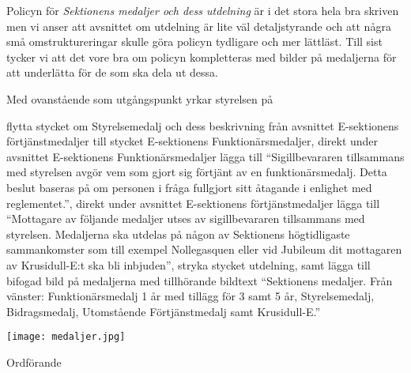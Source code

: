 \documentclass[../_main/handlingar.tex]{subfiles}
\begin{document}

Policyn för \emph{Sektionens medaljer och dess utdelning} är i det stora hela bra skriven men vi anser att avsnittet om utdelning är lite väl detaljstyrande och att några små omstruktureringar skulle göra policyn tydligare och mer lättläst. Till sist tycker vi att det vore bra om policyn kompletteras med bilder på medaljerna för att underlätta för de som ska dela ut dessa.

Med ovanstående som utgångspunkt yrkar styrelsen på

\begin{attsatser}
    \att flytta stycket om Styrelsemedalj och dess beskrivning från avsnittet E-sektionens förtjänstmedaljer till stycket E-sektionens Funktionärsmedaljer,
    \att direkt under avsnittet E-sektionens Funktionärsmedaljer lägga till “Sigillbevararen tillsammans med styrelsen avgör vem som gjort sig förtjänt av en funktionärsmedalj. Detta beslut baseras på om personen i fråga fullgjort sitt åtagande i enlighet med reglementet.”,
    \att direkt under avsnittet E-sektionens förtjänstmedaljer lägga till “Mottagare av följande medaljer utses av sigillbevararen tillsammans med styrelsen. Medaljerna ska utdelas på någon av Sektionens högtidligaste sammankomster som till exempel Nollegasquen eller vid Jubileum dit mottagaren av Krusidull-E:t ska bli inbjuden”,
    \att stryka stycket utdelning, samt
    \att lägga till bifogad bild på medaljerna med tillhörande bildtext “Sektionens medaljer. Från vänster: Funktionärsmedalj 1 år med tillägg för 3 samt 5 år, Styrelsemedalj, Bidragsmedalj, Utomstående Förtjänstmedalj samt Krusidull-E.”
\end{attsatser}

\vspace*{\baselineskip}

\begin{center}
    \texttt{[image: medaljer.jpg]}
\end{center}

\begin{signatures}{1}
    \ist
    \signature{\ordf}{Ordförande}
\end{signatures}
\end{document}
